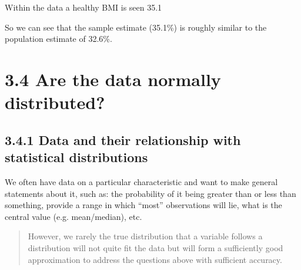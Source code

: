 \documentclass[letterpaper,10pt,english]{jupyterBook}
\begin{document}
\begin{sphinxVerbatim}[commandchars=\\\{\}]
[1] \PYGZdq{}Within the data a healthy BMI is seen 35.1\PYGZpc{}\PYGZdq{}
\end{sphinxVerbatim}

\noindent{}

\sphinxAtStartPar
So we can see that the sample estimate (35.1\%) is roughly similar to the population estimate of 32.6\%.


\section{3.4 Are the data normally distributed?}
\label{\detokenize{03.e. Continuous Probability Distributions:are-the-data-normally-distributed}}\label{\detokenize{03.e. Continuous Probability Distributions::doc}}

\subsection{3.4.1 Data and their relationship with statistical distributions}
\label{\detokenize{03.e. Continuous Probability Distributions:data-and-their-relationship-with-statistical-distributions}}
\sphinxAtStartPar
We often have data on a particular characteristic and want to make general statements about it, such as: the probability of it being greater than or less than something, provide a range in which “most” observations will lie, what is the central value (e.g. mean/median), etc.
\begin{quote}

\sphinxAtStartPar
However,
 \sphinxhyphen{} we rarely  the true distribution that a variable follows
 \sphinxhyphen{} a distribution will not quite fit the data but will form a sufficiently good approximation to address the questions above with sufficient accuracy.
\end{quote}
\end{document}
